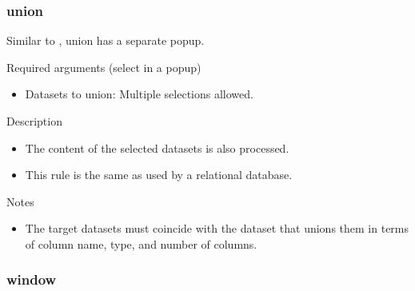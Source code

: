 \documentclass[letterpaper,10pt,english]{sphinxmanual}
\begin{document}
\subsubsection{union}
\label{\detokenize{discovery/part07/rule_kinds:union}}
\begin{figure}[H]
\centering

\noindent{}
\end{figure}

Similar to {\hyperref[\detokenize{discovery/part07/rule_kinds:join}]{}}, union has a separate popup.

Required arguments (select in a popup)
\begin{itemize}
\item {} 
Datasets to union: Multiple selections allowed.

\end{itemize}

Description
\begin{itemize}
\item {} 
The content of the selected datasets is also processed.

\item {} 
This rule is the same as  used by a relational database.

\end{itemize}

Notes
\begin{itemize}
\item {} 
The target datasets must coincide with the dataset that unions them in terms of column name, type, and number of columns.
\begin{quote}

\begin{figure}[H]
\centering

\noindent{}
\end{figure}
\end{quote}

\end{itemize}


\subsubsection{window}
\label{\detokenize{discovery/part07/rule_kinds:window}}
\begin{figure}[H]
\centering

\noindent{}
\end{figure}
\end{document}
